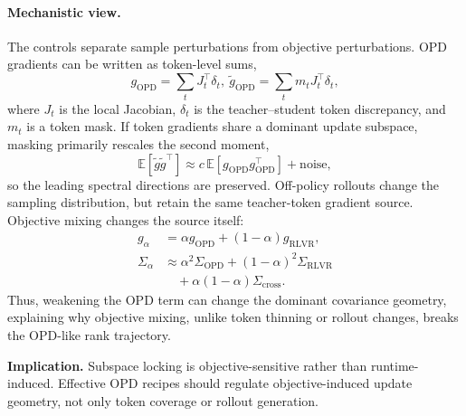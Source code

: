 \documentclass{llmxive}
\begin{document}
\paragraph{Mechanistic view.}
The controls separate sample perturbations from objective perturbations.
OPD gradients can be written as token-level sums,
\begin{equation}
    g_{\mathrm{OPD}}=\sum_t J_t^\top \delta_t , \
    \tilde g_{\mathrm{OPD}}=\sum_t m_t J_t^\top \delta_t ,
\end{equation}
where $J_t$ is the local Jacobian, $\delta_t$ is the teacher--student
token discrepancy, and $m_t$ is a token mask. If token gradients share a
dominant update subspace, masking primarily rescales the second moment,
\begin{equation}
    \mathbb{E}[\tilde g \tilde g^\top]
    \approx
    c\,\mathbb{E}[g_{\mathrm{OPD}}g_{\mathrm{OPD}}^\top]+\mathrm{noise},
\end{equation}
so the leading spectral directions are preserved. Off-policy rollouts
change the sampling distribution, but retain the same teacher-token
gradient source. Objective mixing changes the source itself:
\begin{equation}
\begin{split}
    g_\alpha
    &=
    \alpha g_{\mathrm{OPD}}
    +(1-\alpha)g_{\mathrm{RLVR}}, \\
    \Sigma_\alpha
    &\approx
    \alpha^2\Sigma_{\mathrm{OPD}}
    +(1-\alpha)^2\Sigma_{\mathrm{RLVR}} \\
    &\quad
    +\alpha(1-\alpha)\Sigma_{\mathrm{cross}} .
\end{split}
\end{equation}
Thus, weakening the OPD term can change the dominant covariance geometry,
explaining why objective mixing, unlike token thinning or rollout changes,
breaks the OPD-like rank trajectory.

\begin{takeawaybox}
\textbf{Implication.}
Subspace locking is objective-sensitive rather than runtime-induced.
Effective OPD recipes should regulate objective-induced update geometry,
not only token coverage or rollout generation.
\end{takeawaybox}

\end{document}
